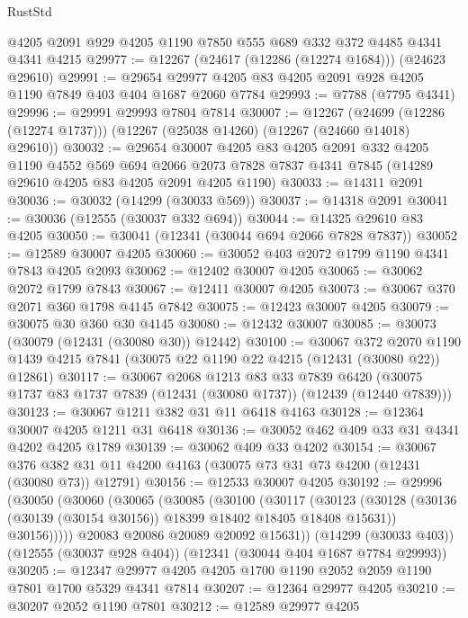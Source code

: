 \begin{lexlean}{RustStd}
\begin{coremodule}
    @4205
    @2091
    @929
    @4205
    @1190
    @7850
    @555
    @689
    @332
    @372
    @4485
    @4341
    @4341
    @4215
@29977 := @12267 (@24617 (@12286 (@12274 @1684))) (@24623 @29610)
@29991 := @29654 @29977 @4205 @83 @4205 @2091 @928 @4205 @1190 @7849 @403 @404 @1687 @2060 @7784
@29993 := @7788 (@7795 @4341)
@29996 := @29991 @29993 @7804 @7814
@30007 := @12267
    (@24699 (@12286 (@12274 @1737)))
    (@12267 (@25038 @14260) (@12267 (@24660 @14018) @29610))
@30032 := @29654
    @30007
    @4205
    @83
    @4205
    @2091
    @332
    @4205
    @1190
    @4552
    @569
    @694
    @2066
    @2073
    @7828
    @7837
    @4341
    @7845
    (@14289 @29610 @4205 @83 @4205 @2091 @4205 @1190)
@30033 := @14311 @2091
@30036 := @30032 (@14299 (@30033 @569))
@30037 := @14318 @2091
@30041 := @30036 (@12555 (@30037 @332 @694))
@30044 := @14325 @29610 @83 @4205
@30050 := @30041 (@12341 (@30044 @694 @2066 @7828 @7837))
@30052 := @12589 @30007 @4205
@30060 := @30052 @403 @2072 @1799 @1190 @4341 @7843 @4205 @2093
@30062 := @12402 @30007 @4205
@30065 := @30062 @2072 @1799 @7843
@30067 := @12411 @30007 @4205
@30073 := @30067 @370 @2071 @360 @1798 @4145 @7842
@30075 := @12423 @30007 @4205
@30079 := @30075 @30 @360 @30 @4145
@30080 := @12432 @30007
@30085 := @30073 (@30079 (@12431 (@30080 @30)) @12442)
@30100 := @30067
    @372
    @2070
    @1190
    @1439
    @4215
    @7841
    (@30075 @22 @1190 @22 @4215 (@12431 (@30080 @22)) @12861)
@30117 := @30067
    @2068
    @1213
    @83
    @33
    @7839
    @6420
    (@30075 @1737 @83 @1737 @7839 (@12431 (@30080 @1737)) (@12439 (@12440 @7839)))
@30123 := @30067 @1211 @382 @31 @11 @6418 @4163
@30128 := @12364 @30007 @4205 @1211 @31 @6418
@30136 := @30052 @462 @409 @33 @31 @4341 @4202 @4205 @1789
@30139 := @30062 @409 @33 @4202
@30154 := @30067
    @376
    @382
    @31
    @11
    @4200
    @4163
    (@30075 @73 @31 @73 @4200 (@12431 (@30080 @73)) @12791)
@30156 := @12533 @30007 @4205
@30192 := @29996
    (@30050
      (@30060
        (@30065
          (@30085
            (@30100
              (@30117
                (@30123
                  (@30128 (@30136 (@30139 (@30154 @30156)) @18399 @18402 @18405 @18408 @15631))
                  @30156)))))
        @20083
        @20086
        @20089
        @20092
        @15631))
    (@14299 (@30033 @403))
    (@12555 (@30037 @928 @404))
    (@12341 (@30044 @404 @1687 @7784 @29993))
@30205 := @12347 @29977 @4205 @4205 @1700 @1190 @2052 @2059 @1190 @7801 @1700 @5329 @4341 @7814
@30207 := @12364 @29977 @4205
@30210 := @30207 @2052 @1190 @7801
@30212 := @12589 @29977 @4205

\end{coremodule}
\end{lexlean}
